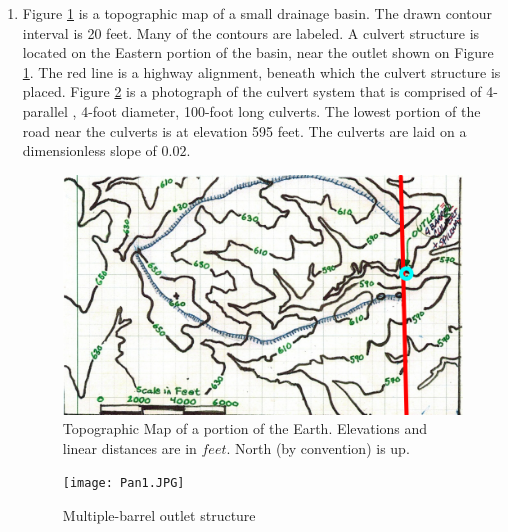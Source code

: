 \documentclass[12pt]{article}
\begin{document}
\begin{enumerate}
\item  Figure \ref{fig:topoMap.jpg} is a  topographic map of a small drainage basin.  The drawn contour interval is 20 feet.  Many of the contours are labeled.   A culvert structure is located on the Eastern portion of the basin, near the outlet shown on Figure \ref{fig:topoMap.jpg}.   The red line is a highway alignment, beneath which the culvert structure is placed.  Figure \ref{fig:Pan1.JPG} is a photograph of the culvert system that is comprised of 4-parallel , 4-foot diameter, 100-foot long culverts.  The lowest portion of the road near the culverts is at elevation 595 feet.  The culverts are laid on a dimensionless slope of $0.02$.

\begin{figure}[h!] %
   \centering
   \includegraphics[width=6.5in]{topoMap.jpg} 
   \caption{Topographic Map of a portion of the Earth.  Elevations and linear distances are in $feet$. North (by convention) is up.}
   \label{fig:topoMap.jpg}
\end{figure}

\begin{figure}[h!] %
   \centering
   \texttt{[image: Pan1.JPG]} 
   \caption{Multiple-barrel outlet structure}
   \label{fig:Pan1.JPG}
\end{figure}
\clearpage


\end{enumerate}
\end{document}
